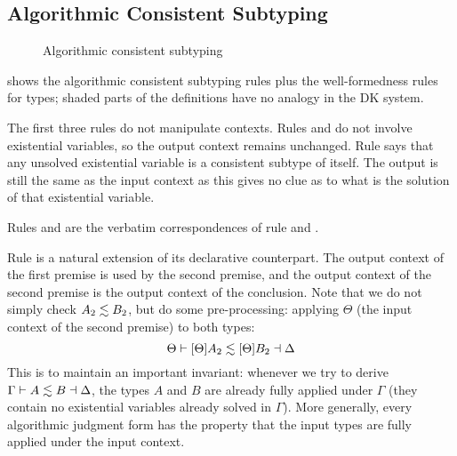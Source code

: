 \subsection{Algorithmic Consistent Subtyping}
\label{sec:algo:subtype}

\begin{figure}[t]
  \centering
  \begin{small}

  \end{small}
  \caption{Algorithmic consistent subtyping}
  \label{fig:algo:subtype}
\end{figure}

 shows the algorithmic consistent subtyping rules
plus the well-formedness rules for types; shaded parts of the definitions have
no analogy in the DK system.

The first three rules do not manipulate contexts. Rules  and
 do not involve existential variables, so the output context
remains unchanged. Rule  says that any unsolved existential
variable is a consistent subtype of itself. The output is still the same as the
input context as this gives no clue as to what is the solution of that
existential variable.

Rules  and  are the verbatim
correspondences of rule  and .

Rule  is a natural extension of its declarative counterpart. The
output context of the first premise is used by the second premise, and the
output context of the second premise is the output context of the conclusion.
Note that we do not simply check $A_2 \lesssim B_2$, but do some
pre-processing: applying $\Theta$ (the input context of the second premise) to
both types:
\[
  \Theta \vdash [\Theta]A_2 \lesssim [\Theta]B_2 \dashv \Delta
\]
This is to maintain an important invariant: whenever we try to derive $\Gamma
\vdash A \lesssim B \dashv \Delta$, the types $A$ and $B$ are already fully
applied under $\Gamma$ (they contain no existential variables already solved in
$\Gamma$). More generally, every algorithmic judgment form has the property that
the input types are fully applied under the input context.

